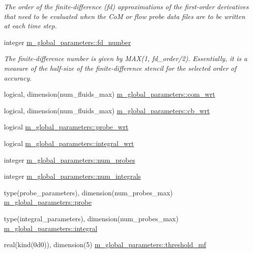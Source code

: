 \begin{DoxyCompactItemize}
\begin{DoxyCompactList}\small\item\em The order of the finite-\/difference (fd) approximations of the first-\/order derivatives that need to be evaluated when the CoM or flow probe data files are to be written at each time step. \end{DoxyCompactList}\item 
integer \hyperlink{namespacem__global__parameters_a60d7ab72fdab2b005144a5a45aa572de}{m\+\_\+global\+\_\+parameters\+::fd\+\_\+number}
\begin{DoxyCompactList}\small\item\em The finite-\/difference number is given by M\+AX(1, fd\+\_\+order/2). Essentially, it is a measure of the half-\/size of the finite-\/difference stencil for the selected order of accuracy. \end{DoxyCompactList}\item 
logical, dimension(num\+\_\+fluids\+\_\+max) \hyperlink{namespacem__global__parameters_a36d8d56515556bc34bc0c88da60f6b62}{m\+\_\+global\+\_\+parameters\+::com\+\_\+wrt}
\item 
logical, dimension(num\+\_\+fluids\+\_\+max) \hyperlink{namespacem__global__parameters_a2ed9e718df8c2a250e5d8cce2e04cbb7}{m\+\_\+global\+\_\+parameters\+::cb\+\_\+wrt}
\item 
logical \hyperlink{namespacem__global__parameters_a2de4a56202a6e2f47ce657fcda4ecdb4}{m\+\_\+global\+\_\+parameters\+::probe\+\_\+wrt}
\item 
logical \hyperlink{namespacem__global__parameters_a530bdd6416ce213046d14488fb48dbc2}{m\+\_\+global\+\_\+parameters\+::integral\+\_\+wrt}
\item 
integer \hyperlink{namespacem__global__parameters_aa4e0d015d4064b37e132c5088089394d}{m\+\_\+global\+\_\+parameters\+::num\+\_\+probes}
\item 
integer \hyperlink{namespacem__global__parameters_a7a86e6e9d4c8b59d28b7404d836fdee8}{m\+\_\+global\+\_\+parameters\+::num\+\_\+integrals}
\item 
type(probe\+\_\+parameters), dimension(num\+\_\+probes\+\_\+max) \hyperlink{namespacem__global__parameters_a028c7e09aaa23dc9ee8844febffed3af}{m\+\_\+global\+\_\+parameters\+::probe}
\item 
type(integral\+\_\+parameters), dimension(num\+\_\+probes\+\_\+max) \hyperlink{namespacem__global__parameters_ac1d4fc341c170b243af0d776ad7ede02}{m\+\_\+global\+\_\+parameters\+::integral}
\item 
real(kind(0d0)), dimension(5) \hyperlink{namespacem__global__parameters_a38317a39628eb007769f26f29b70c958}{m\+\_\+global\+\_\+parameters\+::threshold\+\_\+mf}

\end{DoxyCompactItemize}
